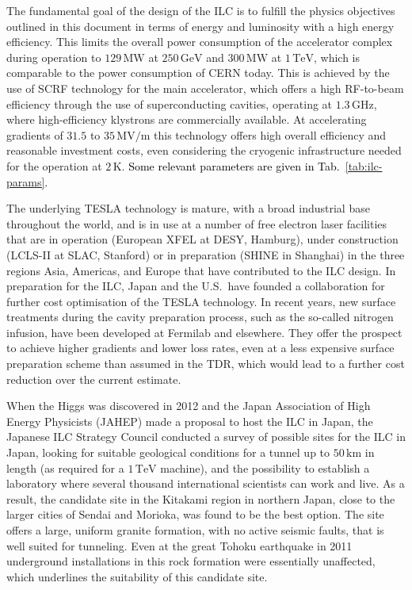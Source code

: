 \documentclass[%
 reprint,
 amsmath,amssymb,
 aps,
]{revtex4-1}
\newcommand{\juan}[1]{\textcolor{black}{{#1}}}
\def\Tab#1{Tab.~\ref{#1}}
\begin{document}
The fundamental goal of the design of the ILC is to fulfill the physics objectives outlined in this document in terms of energy and luminosity with a high energy efficiency.
This limits the overall power consumption of the accelerator complex during operation to $129\,{\mathrm{MW}}$ at  $250\,{\mathrm{GeV}}$ and $300\,{\mathrm{MW}}$ at  $1\,{\mathrm{TeV}}$, which is comparable to the power consumption of CERN today.
This is achieved by the use of SCRF technology for the main accelerator, which offers a high RF-to-beam efficiency through the use of superconducting cavities, operating at $1.3\,{\mathrm{GHz}}$, where high-efficiency klystrons are commercially available.
At accelerating gradients of $31.5$ to $35\,{\mathrm{MV/m}}$ this technology offers high overall efficiency and reasonable investment costs, even considering the cryogenic infrastructure needed for the operation at $2\,{\mathrm{K}}$. \juan{Some relevant parameters are given in \Tab{tab:ilc-params}.}

The underlying TESLA technology is mature, with a broad industrial base throughout the world, and is in use at a number of free electron laser facilities that are in operation (European XFEL at DESY, Hamburg), under construction (LCLS-II at SLAC, Stanford) or in preparation (SHINE in Shanghai) in the three regions Asia, Americas, and Europe that have contributed to the ILC design. In preparation for the ILC, Japan and the U.S.\ have founded a collaboration for further cost optimisation of the TESLA technology.
In recent years, new surface treatments during the cavity preparation process, such as the so-called nitrogen infusion, have been developed at Fermilab and elsewhere.
They offer the prospect to achieve higher gradients and lower loss rates, even at a less expensive surface preparation scheme than assumed in the TDR, which would lead to a further cost reduction over the current estimate.

When the Higgs was discovered in 2012 and the Japan Association of High Energy Physicists (JAHEP) made a proposal to host the ILC in Japan,
the Japanese ILC Strategy Council conducted a survey of possible sites for the ILC in Japan, looking for  suitable geological conditions for a tunnel up to $50\,{\mathrm{km}}$ in length (as required for a $1\,{\mathrm{TeV}}$  machine), and the possibility to establish a laboratory where several thousand international scientists can work and live. 
As a result, the candidate site in the Kitakami region in northern Japan, close to the larger cities of Sendai and Morioka, was found to be the best option. 
The site offers a large, uniform granite formation, with no active seismic faults, that is well suited for tunneling.
Even at the great Tohoku earthquake in 2011 underground installations in this rock formation were essentially unaffected, which underlines the suitability of this candidate site. 
\end{document}
